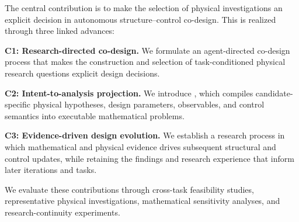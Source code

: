 

The central contribution is to make the selection of physical investigations an explicit decision in autonomous structure--control co-design. This is realized through three linked advances:\par\nopagebreak[4]

\par\smallskip\noindent
\textbf{C1: Research-directed co-design.}\enspace
We formulate an agent-directed co-design process that makes the construction and selection of task-conditioned physical research questions explicit design decisions.

\par\smallskip\noindent
\textbf{C2: Intent-to-analysis projection.}\enspace
We introduce \PPRP{}, which compiles candidate-specific physical hypotheses, design parameters, observables, and control semantics into executable mathematical problems.

\par\smallskip\noindent
\textbf{C3: Evidence-driven design evolution.}\enspace
We establish a research process in which mathematical and physical evidence drives subsequent structural and control updates, while retaining the findings and research experience that inform later iterations and tasks.

We evaluate these contributions through cross-task feasibility studies, representative physical investigations, mathematical sensitivity analyses, and research-continuity experiments.
